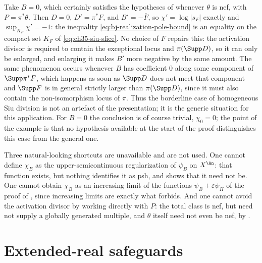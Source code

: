 \begin{example}
\label{ex:ch38-strict-room-fails}
Take $B=0$, which certainly satisfies the hypotheses of
 whenever $\theta$ is nef, with
$P=\pi^*\theta$.  Then $D=0$, $D'=\pi^*F$, and
$B'=-\overline F$, so $\chi'=\log|s_F|$ exactly and
$\sup_{K_F}\chi'=-1$: the inequality
\eqref{eq:bj-realization-pole-bound} is an equality on the compact set
$K_F$ of \eqref{eq:ch35-siu-slice}.  No choice of $F$ repairs this:
the activation divisor is required to contain the exceptional locus and
$\pi(\Supp D)$, so it can only be enlarged, and enlarging it makes
$B'$ more negative by the same amount.  The same phenomenon occurs whenever $B$ has
coefficient $0$ along some component of $\Supp\pi^*F$, which happens
as soon as $\Supp D$ does not meet that component --- and $\Supp F$ is
in general strictly larger than $\pi(\Supp D)$, since it must also
contain the non-isomorphism locus of $\pi$.  Thus the borderline case of
homogeneous Siu division is not an artefact of the presentation; it is the
generic situation for this application.  For $B=0$ the conclusion is of
course trivial, $\chi_0=0$; the point of the example is that no
hypothesis available at the start of the proof distinguishes this case
from the general one.
\end{example}

\begin{remark}
\label{rem:ch38-proof-negative}
Three natural-looking shortcuts are unavailable and are not used.  One
cannot define $\chi_B$ as the upper-semicontinuous regularization of
$\psi_B$ on $X^{\An}$: that function exists, but nothing identifies it
as psh, and  shows that it need not be.  One
cannot obtain $\chi_B$ as an increasing limit of the functions
$\psi_B+\varepsilon\psi_H$ of the proof of
, since increasing limits are exactly
what  forbids.  And one cannot avoid the
activation divisor by working directly with $P$: the total class is nef,
but need not supply a globally generated multiple, and $\theta$ itself need not even be nef, by
.
\end{remark}

\section{Extended-real safeguards}
\label{sec:ch38-safeguards}

